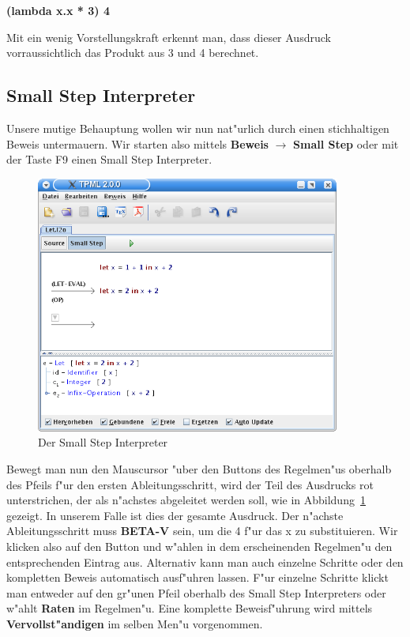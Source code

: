{\bf (lambda x.x * 3) 4}

Mit ein wenig Vorstellungskraft erkennt man, dass dieser Ausdruck
vorraussichtlich das Produkt aus 3 und 4 berechnet.


\subsection{Small Step Interpreter}
Unsere mutige Behauptung wollen wir nun nat"urlich durch einen
stichhaltigen Beweis untermauern. Wir starten also mittels {\bf
Beweis} $\rightarrow$ {\bf Small Step} oder mit der Taste F9 einen
Small Step Interpreter.

\begin{figure}[h]
\begin{center}
\includegraphics[width=10cm]{images/small-step.png}
\caption{Der Small Step Interpreter}
\label{FigureSmallStep}
\end{center}
\end{figure}

Bewegt man nun den Mauscursor "uber den Buttons des Regelmen"us
oberhalb des Pfeils f"ur den ersten Ableitungsschritt, wird der Teil
des Ausdrucks rot unterstrichen, der als n"achstes abgeleitet werden
soll, wie in Abbildung~\ref{FigureSmallStep} gezeigt.
In unserem Falle ist dies der gesamte Ausdruck. Der n"achste
Ableitungsschritt muss {\bf BETA-V} sein, um die 4 f"ur das x zu
substituieren. Wir klicken also auf den Button und w"ahlen in dem
erscheinenden Regelmen"u den entsprechenden Eintrag aus. Alternativ
kann man auch einzelne Schritte oder den kompletten Beweis
automatisch ausf"uhren lassen. F"ur einzelne Schritte klickt man
entweder auf den gr"unen Pfeil oberhalb des Small Step Interpreters
oder w"ahlt {\bf Raten} im Regelmen"u. Eine komplette Beweisf"uhrung
wird mittels {\bf Vervollst"andigen} im selben Men"u vorgenommen.

